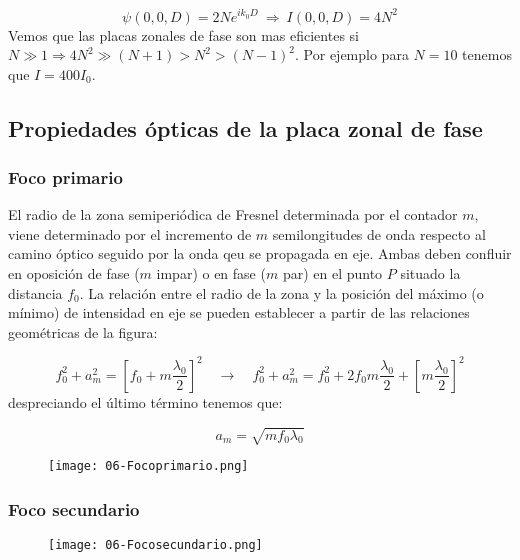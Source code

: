 \documentclass[12pt,a4paper]{book}
\numberwithin{equation}{section}
\numberwithin{figure}{section}
\newcommand{\ccorchetes}[1]{\left[ #1  \right]}
\newcommand{\1}{_{(1)}}
\newcommand{\2}{_{(2)}}
\theoremstyle{definition}
\begin{document}
\begin{equation}
    \psi (0,0,D) = 2N e^{ik_0D}  \ \Rightarrow \ I(0,0,D) = 4N^2
\end{equation}
Vemos que las placas zonales de fase son mas eficientes si $N\gg 1 \Rightarrow 4N^2 \gg (N+1)>N^2 > (N-1)^2$. Por ejemplo para $N=10$ tenemos que $I=400I_0$. 

\subsection{Propiedades ópticas de la placa zonal de fase}

\subsubsection{Foco primario}

El radio de la zona semiperiódica de Fresnel determinada por el contador $m$, viene determinado por el incremento de $m$ semilongitudes de onda respecto al camino óptico seguido por la onda qeu se propagada en eje. Ambas deben confluir en oposición de fase ($m$ impar) o en fase ($m$ par) en el punto $P$ situado la distancia $f_0$. La relación entre el radio de la zona y la posición del máximo (o mínimo) de intensidad en eje se pueden establecer a partir de las relaciones geométricas de la figura:

\begin{equation}
    f_0^2 + a_m^2 = \ccorchetes{f_0 + m \frac{\lambda_0}{2}}^2 \quad \rightarrow \quad f_0^2 +a_m^2 = f_0^2 + 2 f_0 m \frac{\lambda_0}{2}+ \ccorchetes{m \frac{\lambda_0}{2}}^2
\end{equation}
despreciando el último término tenemos que:

\begin{equation}
    a_m = \sqrt{m f_0 \lambda_0}
\end{equation}

\begin{figure}[h!]
    \centering
    \texttt{[image: 06-Focoprimario.png]}
    \caption{}
    \label{Fig:06.3-01}
\end{figure}

\subsubsection{Foco secundario}

\begin{figure}[h!]
    \centering
    \texttt{[image: 06-Focosecundario.png]}
    \caption{}
    \label{Fig:06.03-02}
\end{figure}
\end{document}
